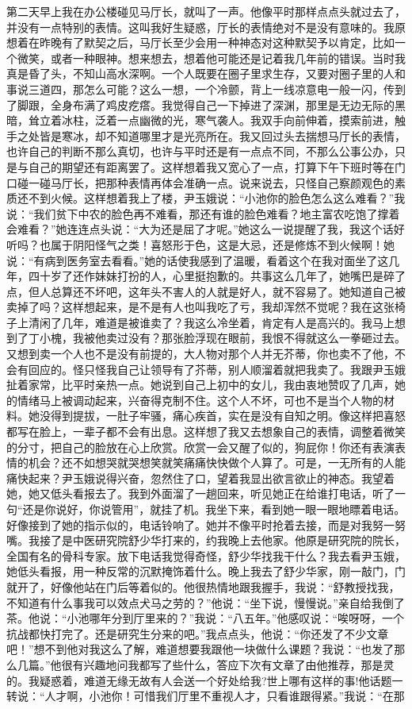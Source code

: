 \documentclass[12pt,oneside]{book}
\begin{document}
第二天早上我在办公楼碰见马厅长，就叫了一声。他像平时那样点点头就过去了，并没有一点特别的表情。这叫我好生疑惑，厅长的表情绝对不是没有意味的。我原想着在昨晚有了默契之后，马厅长至少会用一种神态对这种默契予以肯定，比如一个微笑，或者一种眼神。想来想去，想着他可能还是记着我几年前的错误。当时我真是昏了头，不知山高水深啊。一个人既要在圈子里求生存，又要对圈子里的人和事说三道四，那怎么可能？这么一想，一个冷颤，背上一线凉意电一般一闪，传到了脚跟，全身布满了鸡皮疙瘩。我觉得自己一下掉进了深渊，那里是无边无际的黑暗，耸立着冰柱，泛着一点幽微的光，寒气袭人。我双手向前伸着，摸索前进，触手之处皆是寒冰，却不知道哪里才是光亮所在。我又回过头去揣想马厅长的表情，也许自己的判断不那么真切，也许与平时还是有一点点不同，不那么公事公办，只是与自己的期望还有距离罢了。这样想着我又宽心了一点，打算下午下班时等在门口碰一碰马厅长，把那种表情再体会准确一点。说来说去，只怪自己察颜观色的素质还不到火候。这样想着我上了楼，尹玉娥说：``小池你的脸色怎么这么难看？''我说：``我们贫下中农的脸色再不难看，那还有谁的脸色难看？地主富农吃饱了撑着会难看？''她连连点头说：``大为还是屈了才呢。''她这么一说提醒了我，我这个话好听吗？也属于阴阳怪气之类！喜怒形于色，这是大忌，还是修炼不到火候啊！她说：``有病到医务室去看看。''她的话使我感到了温暖，看着这个在我对面坐了这几年，四十岁了还作妹妹打扮的人，心里挺抱歉的。共事这么几年了，她嘴巴是碎了点，但人总算还不坏吧，这年头不害人的人就是好人，就不容易了。她知道自己被卖掉了吗？这样想起来，是不是有人也叫我吃了亏，我却浑然不觉呢？我在这张椅子上清闲了几年，难道是被谁卖了？我这么冷坐着，肯定有人是高兴的。我马上想到了丁小槐，我被他卖过没有？那张脸浮现在眼前，我恨不得就这么一拳砸过去。又想到卖一个人也不是没有前提的，大人物对那个人并无芥蒂，你也卖不了他，不会有回应的。怪只怪我自己让领导有了芥蒂，别人顺溜着就把我卖了。我跟尹玉娥扯着家常，比平时亲热一点。她说到自己上初中的女儿，我由衷地赞叹了几声，她的情绪马上被调动起来，兴奋得克制不住。这个人不坏，可也不是当个人物的材料。她没得到提拔，一肚子牢骚，痛心疾首，实在是没有自知之明。像这样把喜怒都写在脸上，一辈子都不会有出息。这样想了我又去想象自己的表情，调整着微笑的分寸，把自己的脸放在心上欣赏。欣赏一会又醒了似的，狗屁你！你还有表演表情的机会？还不如想哭就哭想笑就笑痛痛快快做个人算了。可是，一无所有的人能痛快起来？尹玉娥说得兴奋，忽然住了口，望着我显出欲言欲止的神态。我望着她，她又低头看报去了。我到外面溜了一趟回来，听见她正在给谁打电话，听了一句``还是你说好，你说管用''，就挂了机。我坐下来，看到她一眼一眼地瞟着电话。好像接到了她的指示似的，电话铃响了。她并不像平时抢着去接，而是对我努一努嘴。我接了是中医研究院舒少华打来的，约我晚上去他家。他原是研究院的院长，全国有名的骨科专家。放下电话我觉得奇怪，舒少华找我干什么？我去看尹玉娥，她低头看报，用一种反常的沉默掩饰着什么。晚上我去了舒少华家，刚一敲门，门就开了，好像他站在门后等着似的。他很热情地跟我握手，我说：``舒教授找我，不知道有什么事我可以效点犬马之劳的？''他说：``坐下说，慢慢说。''亲自给我倒了茶。他说：``小池哪年分到厅里来的？''我说：``八五年。''他感叹说：``唉呀呀，一个抗战都快打完了。还是研究生分来的吧。''我点点头，他说：``你还发了不少文章吧！''想不到他对我这么了解，难道想要我跟他一块做什么课题？我说：``也发了那么几篇。''他很有兴趣地问我都写了些什么，答应下次有文章了由他推荐，那是灵的。我疑惑着，难道无缘无故有人会送一个好处给我?世上哪有这样的事!他话题一转说：``人才啊，小池你！可惜我们厅里不重视人才，只看谁跟得紧。''我说：``在那
\end{document}
